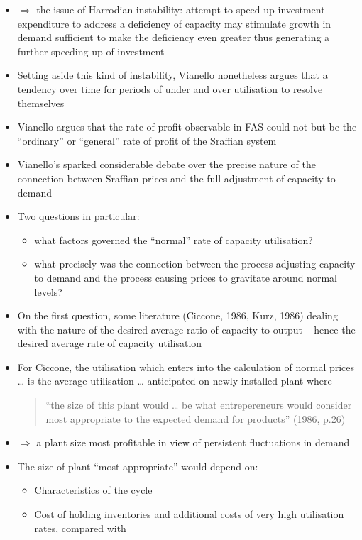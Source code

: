 \documentclass[a4paper,twoside]{article}
\numberwithin{equation}{section}
\numberwithin{figure}{section}
\begin{document}
\begin{itemize}
		\item \( \Rightarrow \) the issue of Harrodian instability: attempt to speed up investment expenditure to address a deficiency of capacity may stimulate growth in demand sufficient to make the deficiency even greater thus generating a further speeding up of investment
		\item Setting aside this kind of instability, Vianello nonetheless argues that a tendency over time for periods of under and over utilisation to resolve themselves
		\item Vianello argues that the rate of profit observable in FAS could not but be the ``ordinary'' or ``general'' \textcolor{myred}{rate of profit} of the Sraffian system
		\item Vianello's sparked considerable debate over the precise nature of the connection between Sraffian prices and the full-adjustment of capacity to demand
		\item Two questions in particular:
		\begin{itemize}
			\item what factors governed the ``normal'' rate of capacity utilisation?
			\item what precisely was the connection between the process adjusting capacity to demand and the process causing prices to gravitate around normal levels?
		\end{itemize}
		\item On the first question, some literature (Ciccone, 1986, Kurz, 1986) dealing with the nature of the desired average ratio of capacity to output -- hence the desired average rate of capacity utilisation
		\item For Ciccone, the utilisation which enters into the calculation of normal prices \dots\: is the average utilisation \dots\: anticipated on newly installed plant where
		\begin{quote}
			``the size of this plant would … be what entrepereneurs would consider most appropriate to the expected demand for products''  (1986, p.26)
		\end{quote}
		\item \( \Rightarrow \) a plant size most profitable in view of persistent fluctuations in demand
		\item The size of plant ``most appropriate'' would depend on:
		\begin{itemize}
			\item Characteristics of the cycle
			\item Cost of holding inventories and additional costs of very high utilisation rates, compared with

\end{itemize}
\end{itemize}
\end{document}
